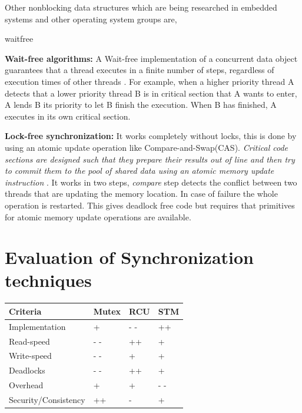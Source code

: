 Other nonblocking data structures which are being researched in embedded systems and other operating system groups are, 

\begin{labeling}{waitfree}
\item[\textbf{Wait-free algorithms:}] A Wait-free implementation of a concurrent data object guarantees that a thread executes in a finite number of steps, regardless of execution times of other threads  \cite{herlihy1991wait}. For example, when a higher priority thread A detects that a lower priority thread B is in critical section that A wants to enter, A lends B its priority to let B finish the execution. When B has finished, A executes in its own critical section.


\item [\textbf{Lock-free synchronization:}] It works completely without locks, this is done by using an atomic update operation like Compare-and-Swap(CAS). \textit{Critical code sections are designed such that they prepare their results out of line and then try to commit them to the pool of shared data using an atomic memory update instruction} \cite{hohmuth2001pragmatic}. It works in two steps, \textit{compare} step detects the conflict between two threads that are updating the memory location. In case of failure the whole operation is restarted. This gives deadlock free code but requires that primitives for atomic memory update operations are available.
\end{labeling}



\section{Evaluation of Synchronization techniques}

\begin{center}
\begin{tabular}{|l|l|l|p{3cm}|}
\hline 
\textbf{Criteria} & \textbf{Mutex} & \textbf{RCU} & \textbf{STM} \\ \hline

Implementation & + & - - & ++ \\ \hline

Read-speed & - - & ++ & + \\ \hline

Write-speed & - - & + & + \\ \hline

Deadlocks & - - & ++ & + \\ \hline

Overhead & + & + & - - \\ \hline

Security/Consistency & ++ & - & + \\ \hline
\end{tabular}
\label{tab:lock}
\end{center}

